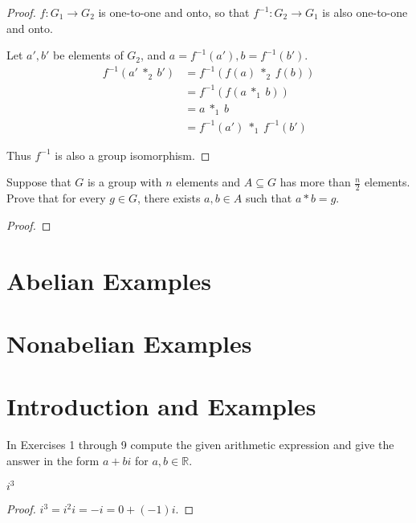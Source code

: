 \begin{proof}
    $f: G_{1} \to G_{2}$ is one-to-one and onto, so that $f^{-1}: G_{2} \to G_{1}$ is also one-to-one and onto.

    Let $a', b'$ be elements of $G_{2}$, and $a = f^{-1}(a'), b = f^{-1}(b')$.
    \begin{align*}
        f^{-1}(a'\ {*}_{2}\ b') & = f^{-1}(f(a)\ {*}_{2}\ f(b))     \\
                                & = f^{-1}(f(a\ {*}_{1}\ b))        \\
                                & = a\ {*}_{1}\ b                   \\
                                & = f^{-1}(a')\ {*}_{1}\ f^{-1}(b')
    \end{align*}

    Thus $f^{-1}$ is also a group isomorphism.
\end{proof}

\begin{exercise}
    Suppose that $G$ is a group with $n$ elements and $A\subseteq G$ has more than $\frac{n}{2}$ elements. Prove that for every $g\in G$, there exists $a, b\in A$ such that $a * b = g$.
\end{exercise}

\begin{proof}
\end{proof}

\section{Abelian Examples}


\section{Nonabelian Examples}

\section{Introduction and Examples}
\setcounter{exercise}{0}

In Exercises 1 through 9 compute the given arithmetic expression and give the answer in the form $a + bi$ for $a, b\in \mathbb{R}$.

\begin{exercise}
    $i^{3}$
\end{exercise}

\begin{proof}
    $i^{3} = {i}^{2}i = -i = 0 + (-1)i$.
\end{proof}

